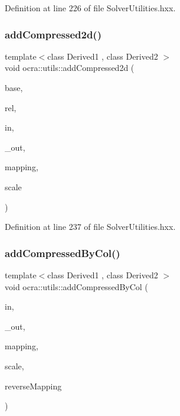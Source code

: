 Definition at line 226 of file Solver\+Utilities.\+hxx.

\hypertarget{namespaceocra_1_1utils_af486ff6d7c311e33a0c7d647eb45bcd6}{}\label{namespaceocra_1_1utils_af486ff6d7c311e33a0c7d647eb45bcd6} 
\subsubsection{\texorpdfstring{add\+Compressed2d()}{addCompressed2d()}\hspace{0.1cm}{\footnotesize\ttfamily [2/2]}}
{\footnotesize\ttfamily template$<$class Derived1 , class Derived2 $>$ \\
void ocra\+::utils\+::add\+Compressed2d (\begin{DoxyParamCaption}\item[{const \hyperlink{classocra_1_1Variable}{Variable} \&}]{base,  }\item[{const \hyperlink{classocra_1_1Variable}{Variable} \&}]{rel,  }\item[{const Matrix\+Base$<$ Derived1 $>$ \&}]{in,  }\item[{Matrix\+Base$<$ Derived2 $>$ const \&}]{\+\_\+out,  }\item[{std\+::vector$<$ int $>$ \&}]{mapping,  }\item[{double}]{scale }\end{DoxyParamCaption})\hspace{0.3cm}{\ttfamily [inline]}}



Definition at line 237 of file Solver\+Utilities.\+hxx.

\hypertarget{namespaceocra_1_1utils_a4a6965e28f8a5284f406ca2cea54a221}{}\label{namespaceocra_1_1utils_a4a6965e28f8a5284f406ca2cea54a221} 
\subsubsection{\texorpdfstring{add\+Compressed\+By\+Col()}{addCompressedByCol()}\hspace{0.1cm}{\footnotesize\ttfamily [1/2]}}
{\footnotesize\ttfamily template$<$class Derived1 , class Derived2 $>$ \\
void ocra\+::utils\+::add\+Compressed\+By\+Col (\begin{DoxyParamCaption}\item[{const Matrix\+Base$<$ Derived1 $>$ \&}]{in,  }\item[{Matrix\+Base$<$ Derived2 $>$ const \&}]{\+\_\+out,  }\item[{const std\+::vector$<$ int $>$ \&}]{mapping,  }\item[{double}]{scale,  }\item[{bool}]{reverse\+Mapping }\end{DoxyParamCaption})\hspace{0.3cm}{\ttfamily [inline]}}



